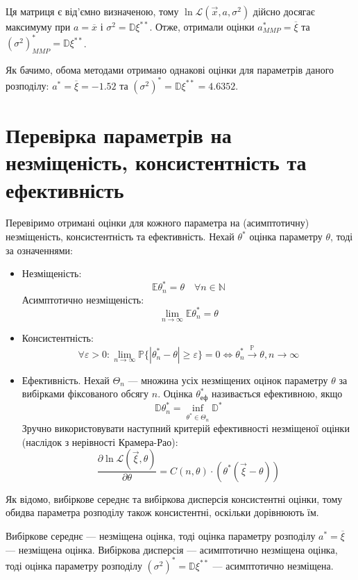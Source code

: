 \documentclass[14pt, a4paper, ukrainian]{extreport}
\begin{document}
	Ця матриця є від'ємно визначеною, тому $\ln\mathcal{L}(\vec{x}, a, \sigma^2)$ дійсно досягає максимуму при $a = \overline{x}$ і $\sigma^2 = \mathbb{D}\xi^{**}$. Отже, отримали оцінки $a_{MMP}^* = \overline{\xi}$ та $(\sigma^2)_{MMP}^* = \mathbb{D}\xi^{**}$.
	
	Як бачимо, обома методами отримано однакові оцінки для параметрів даного розподілу: $a^* = \overline{\xi} = -1.52$ та $(\sigma^2)^* = \mathbb{D}\xi^{**} = 4.6352$.
	
	\chapter{Перевірка параметрів на незміщеність, консистентність та ефективність}
	
	Перевіримо отримані оцінки для кожного параметра на (асимптотичну) незміщеність, консистентність та ефективність. Нехай $\theta^*$ оцінка параметру $\theta$, тоді за означеннями:
	\begin{itemize}
		\item Незміщеність:
		$$ \mathbb{E}\theta_n^* = \theta \quad \forall n \in \mathbb{N}$$
		Асимптотично незміщеність:
		$$\lim_{n \to \infty}\mathbb{E}\theta_n^* = \theta$$
		\item Консистентність:
		$$\forall \varepsilon > 0: \lim_{n \to \infty} \mathbb{P} \{|\theta_n^* - \theta| \geq \varepsilon\} = 0 \Leftrightarrow \theta_n^* \xrightarrow{\mathbb{P}} \theta, n \to \infty$$
		\item Ефективність. Нехай $\Theta_n$ --- множина усіх незміщених оцінок параметру $\theta$ за вибірками фіксованого обсягу $n$. Оцінка $\theta_{\text{еф}}^*$ називається ефективною, якщо
		$$ \mathbb{D}\theta_n^* = \inf_{\theta^* \in \Theta_n}\mathbb{D}^*$$
		Зручно використовувати наступний критерій ефективності незміщеної оцінки (наслідок з нерівності Крамера-Рао):
		$$\frac{\partial \ln \mathcal{L}(\vec{\xi}, \theta)}{\partial \theta} = C(n, \theta)\cdot\left(\theta^*(\vec{\xi} - \theta)\right)$$
	\end{itemize}
	
	Як відомо, вибіркове середнє та вибіркова дисперсія консистентні оцінки, тому обидва параметра розподілу також консистентні, оскільки дорівнюють їм. 
	
	Вибіркове середнє --- незміщена оцінка, тоді оцінка параметру розподілу $a^* = \overline{\xi}$ --- незміщена оцінка. Вибіркова дисперсія --- асимптотично незміщена оцінка, тоді оцінка параметру розподілу $(\sigma^2)^* = \mathbb{D}\xi^{**}$ --- асимптотично незміщена. 
	
\end{document}
